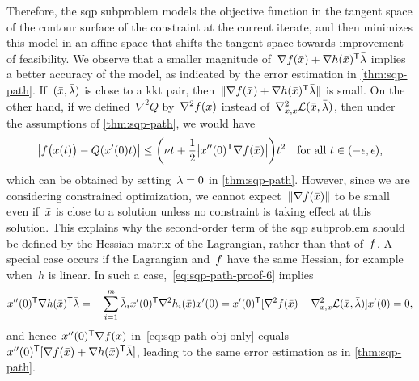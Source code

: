 Therefore, the \gls{sqp} subproblem models the objective function in the tangent space of the contour surface of the constraint at the current iterate, and then minimizes this model in an affine space that shifts the tangent space towards improvement of feasibility.
We observe that a smaller magnitude of~$\nabla \obj(\bar{\iter}) + \nabla h(\bar{\iter})^{\T} \bar{\lm}$ implies a better accuracy of the model, as indicated by the error estimation in \cref{thm:sqp-path}.
If~$(\bar{\iter}, \bar{\lm})$ is close to a \gls{kkt} pair, then~$\norm{\nabla \obj(\bar{\iter}) + \nabla h(\bar{\iter})^{\T} \bar{\lm}}$ is small.
On the other hand, if we defined~$\nabla^2 Q$ by~$\nabla^2 \obj(\bar{\iter})$ instead of~$\nabla_{x, x}^2 \lag(\bar{\iter}, \bar{\lm})$, then under the assumptions of \cref{thm:sqp-path}, we would have
\begin{equation}
    \label{eq:sqp-path-obj-only}
    \abs[\big]{\obj \big( \iter(t) \big) - Q(x'(0) t)} \le \bigg( \nu t + \frac{1}{2} \abs[\big]{\iter''(0)^{\T} \nabla \obj(\bar{\iter})} \bigg) t^2 \quad \text{for all~$t \in (-\epsilon, \epsilon)$,}
\end{equation}
which can be obtained by setting~$\bar{\lm} = 0$ in \cref{thm:sqp-path}.
However, since we are considering constrained optimization, we cannot expect~$\norm{\nabla \obj(\bar{\iter})}$ to be small even if~$\bar{\iter}$ is close to a solution unless no constraint is taking effect at this solution.
This explains why the second-order term of the \gls{sqp} subproblem should be defined by the Hessian matrix of the Lagrangian, rather than that of~$f$.
A special case occurs if the Lagrangian and~$f$ have the same Hessian, for example when~$h$ is linear.
In such a case,~\cref{eq:sqp-path-proof-6} implies
\begin{equation*}
    \iter''(0)^{\T} \nabla h(\bar{\iter})^{\T} \bar{\lm} = -\sum_{i = 1}^m \bar{\lm}_i \iter'(0)^{\T} \nabla^2 h_i(\bar{\iter}) \iter'(0) = \iter'(0)^{\T} [\nabla^2 \obj(\bar{\iter}) - \nabla_{x, x}^2 \lag(\bar{\iter}, \bar{\lm})] \iter'(0) = 0,
\end{equation*}
and hence~$\iter''(0)^{\T} \nabla \obj(\bar{\iter})$ in~\cref{eq:sqp-path-obj-only} equals~$\iter''(0)^{\T} [\nabla \obj(\bar{\iter}) + \nabla h(\bar{\iter})^{\T} \bar{\lm}]$, leading to the same error estimation as in \cref{thm:sqp-path}.

